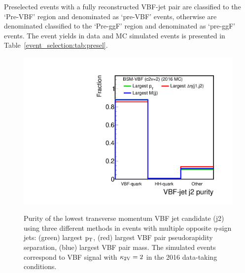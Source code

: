 Preselected events with a fully reconstructed VBF-jet pair are classified to the `Pre-VBF' region and denominated as `pre-VBF' events, otherwise are denominated classified to the `Pre-ggF' region and denominated as `pre-ggF' events. The event yields in data and MC simulated events is presented in Table~\ref{event_selection:tab:presel}.

\begin{figure}[htb]
\begin{center}
\includegraphics[width=0.50\linewidth]{Figures/AnalysisStrategy/eventselection/pairing/purityBSMvbf2016.pdf}\\
\end{center}
\vspace{-0.5cm}
\caption[Purity of the lowest tranverse momentum VBF jet candidate]{Purity of the lowest transverse momentum VBF jet candidate (j2) using three different methods in events with multiple opposite $\eta$-sign jets: (green) largest $\mathrm{p_{T}}$, (red) largest VBF pair pseudorapidity separation, (blue) largest VBF pair mass. The simulated events correspond to VBF signal with $\mathrm{\kappa_{2V} }=2$ in the 2016 data-taking conditions.}
\label{fig:vbfj2purity}
\end{figure}

